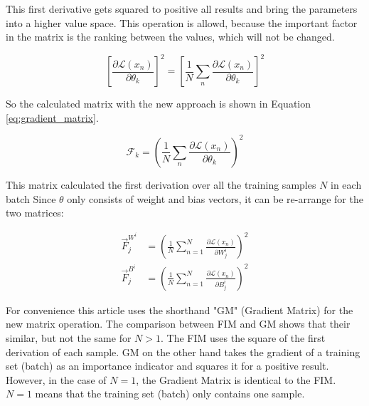 This first derivative gets squared to positive all results and bring the parameters into a higher value space.
This operation is allowd, because the important factor in the matrix is the ranking between the values, which will not be changed.

\begin{equation}
    \left[
        \frac{\partial \mathcal{L}(x_n)}{\partial \theta_k}
        \right]^2
    = 
    \left[
        \frac{1}{N}
        \sum_{n} 
            \frac{\partial \mathcal{L}(x_n)}{\partial \theta_k}
        \right]^2
\end{equation}

So the calculated matrix with the new approach is shown in Equation \eqref{eq:gradient_matrix}.

\begin{equation}
    \mathcal{F}_k =
    \left(
        \frac{1}{N}
        \sum_{n} 
            \frac{\partial \mathcal{L}(x_n)}{\partial \theta_k}
        \right)^2
    \label{eq:gradient_matrix}
\end{equation}

This matrix calculated the first derivation over all the training samples $N$ in each batch
Since $\theta$ only consists of weight and bias vectors, it can be re-arrange for the two matrices:

\begin{equation}
    \begin{split}
        \vec{F}^{W^i}_j & = 
        \left(
            \frac{1}{N} 
            \sum_{n=1}^{N}
            \frac{\partial \mathcal{L} \left( x_n \right) }{\partial W^i_{j}}
        \right)^2
        \\
        \vec{F}^{B^i}_j & = 
        \left(
            \frac{1}{N} 
            \sum_{n=1}^{N} 
            \frac{\partial \mathcal{L} \left( x_n \right) }{\partial B^i_{j}}
        \right)^2
    \end{split}
\end{equation}


For convenience this article uses the shorthand "GM" (Gradient Matrix) for the new matrix operation.
\newline
The comparison between FIM and GM shows that their similar, but not the same for $N > 1$.
The FIM uses the square of the first derivation of each sample. GM on the other hand takes the gradient of a training set (batch) as an importance indicator and squares it for a positive result.
However, in the case of $N=1$, the Gradient Matrix is identical to the FIM.
$N=1$ means that the training set (batch) only contains one sample.

